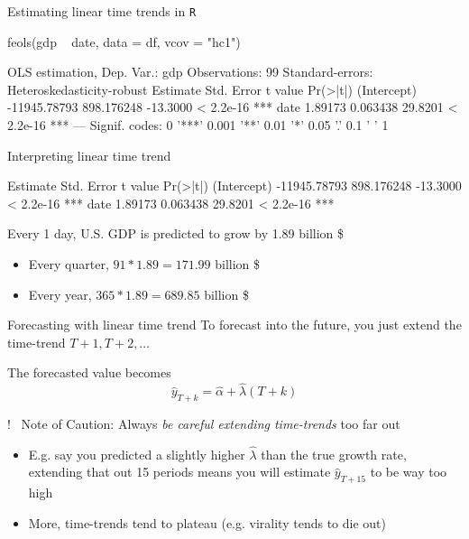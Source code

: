 \documentclass[aspectratio=169,t,11pt,table]{beamer}
\begin{document}
\begin{frame}[fragile]{Estimating linear time trends in \texttt{R}}

  \begin{codeblock}
feols(gdp ~ date, data = df, vcov = "hc1")
  \end{codeblock}

  \medskip
  \begin{codeblock}[{}]
OLS estimation, Dep. Var.: gdp
Observations: 99
Standard-errors: Heteroskedasticity-robust 
                Estimate Std. Error  t value  Pr(>|t|)    
(Intercept) -11945.78793 898.176248 -13.3000 < 2.2e-16 ***
date             1.89173   0.063438  29.8201 < 2.2e-16 ***
---
Signif. codes:  0 '***' 0.001 '**' 0.01 '*' 0.05 '.' 0.1 ' ' 1
  \end{codeblock}
\end{frame}

\begin{frame}[fragile]{Interpreting linear time trend}
  \vspace*{-\bigskipamount}
  \begin{codeblock}[{}]
                Estimate Std. Error  t value  Pr(>|t|)    
(Intercept) -11945.78793 898.176248 -13.3000 < 2.2e-16 ***
date             1.89173   0.063438  29.8201 < 2.2e-16 ***
  \end{codeblock}

  \bigskip
  Every 1 day, U.S. GDP is predicted to grow by 1.89 billion \$ 
  \begin{itemize}
    \item Every quarter, $91 * 1.89 = 171.99$ billion \$

    \item Every year, $365 * 1.89 = 689.85$ billion \$
  \end{itemize}
\end{frame}

\begin{frame}{Forecasting with linear time trend}
  To forecast into the future, you just extend the time-trend $T+1, T+2, \dots$
  
  \bigskip
  The forecasted value becomes 
  $$
    \hat{y}_{T+k} = \hat{\alpha} + \hat{\lambda} (T+k)
  $$

  \pause
  \begin{tcolorbox}[boxrule = 0pt, frame hidden, sharp corners, enhanced, borderline west = {4pt}{0pt}{yellow}, interior hidden]
    {\color{yellow}\Large $!$\ } Note of Caution: Always \emph{be careful extending time-trends} too far out
  \end{tcolorbox}

  \begin{itemize}
    \item E.g. say you predicted a slightly higher $\hat{\lambda}$ than the true growth rate, extending that out 15 periods means you will estimate $\hat{y}_{T + 15}$ to be way too high
  
    \smallskip
    \item More, time-trends tend to plateau (e.g. virality tends to die out)
  \end{itemize}
\end{frame}
\end{document}
